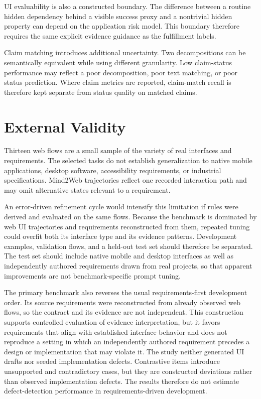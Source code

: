 UI evaluability is also a constructed boundary. The difference between a
routine hidden dependency behind a visible success proxy and a nontrivial
hidden property can depend on the application risk model. This boundary
therefore requires the same explicit evidence guidance as the fulfillment
labels.

Claim matching introduces additional uncertainty. Two decompositions can be
semantically equivalent while using different granularity. Low claim-status
performance may reflect a poor decomposition, poor text matching, or poor
status prediction. Where claim metrics are reported, claim-match recall is
therefore kept separate from status quality on matched claims.

\section{External Validity}\label{external-validity}

Thirteen web flows are a small sample of the variety of real interfaces and requirements. The selected tasks do not establish generalization to native mobile applications, desktop software, accessibility requirements, or industrial specifications. Mind2Web trajectories reflect one recorded interaction path and may omit alternative states relevant to a requirement.

An error-driven refinement cycle would intensify this limitation if rules were
derived and evaluated on the same flows. Because the benchmark is dominated by
web UI trajectories and requirements reconstructed from them, repeated tuning
could overfit both its interface type and its evidence patterns. Development
examples, validation flows, and a held-out test set should therefore be
separated. The test set should include native mobile and desktop interfaces as
well as independently authored requirements drawn from real projects, so that
apparent improvements are not benchmark-specific prompt tuning.

The primary benchmark also reverses the usual requirements-first development
order. Its source requirements were reconstructed from already observed web
flows, so the contract and its evidence are not independent. This construction
supports controlled evaluation of evidence interpretation, but it favors
requirements that align with established interface behavior and does not
reproduce a setting in which an independently authored requirement precedes a
design or implementation that may violate it. The study neither generated UI
drafts nor seeded implementation defects. Contrastive items introduce
unsupported and contradictory cases, but they are constructed deviations
rather than observed implementation defects. The results therefore do not
estimate defect-detection performance in requirements-driven development.

